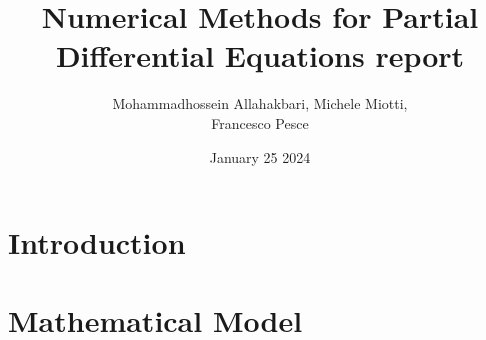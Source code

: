\documentclass{article}
\title{Numerical Methods for Partial Differential Equations report}
\author{Mohammadhossein Allahakbari, Michele Miotti, \\Francesco Pesce}
\date{January 25 2024}
\begin{document}
\maketitle


\section{Introduction}
	

\section{Mathematical Model}
	


%
%
\end{document}
